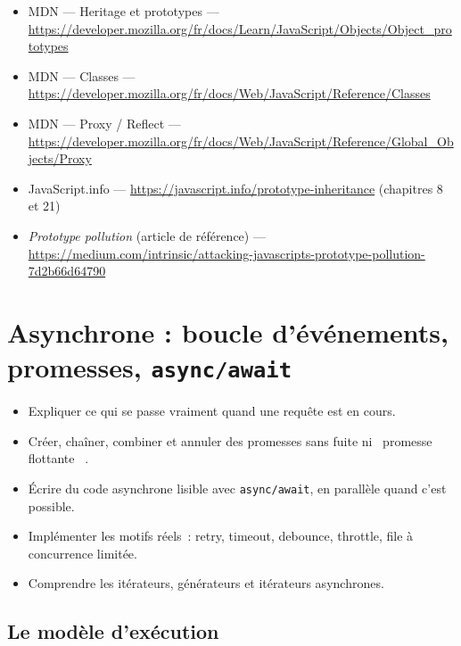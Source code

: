 \documentclass[12pt,a4paper,twoside,openright]{book}
\begin{document}
\begin{ressources}
\begin{itemize}
  \item MDN --- Heritage et prototypes --- \url{https://developer.mozilla.org/fr/docs/Learn/JavaScript/Objects/Object_prototypes}
  \item MDN --- Classes --- \url{https://developer.mozilla.org/fr/docs/Web/JavaScript/Reference/Classes}
  \item MDN --- Proxy / Reflect --- \url{https://developer.mozilla.org/fr/docs/Web/JavaScript/Reference/Global_Objects/Proxy}
  \item JavaScript.info --- \url{https://javascript.info/prototype-inheritance} (chapitres 8 et 21)
  \item \emph{Prototype pollution} (article de r\'ef\'erence) --- \url{https://medium.com/intrinsic/attacking-javascripts-prototype-pollution-7d2b66d64790}
\end{itemize}
\end{ressources}

\chapter{Asynchrone : boucle d'\'ev\'enements, promesses, \texttt{async/await}}
\label{ch-js-async}

\begin{objectif}
\begin{itemize}
  \item Expliquer ce qui se passe vraiment quand une requ\^ete est en cours.
  \item Cr\'eer, cha\^iner, combiner et annuler des promesses sans fuite ni \og ~promesse flottante~ \fg{}.
  \item \'Ecrire du code asynchrone lisible avec \verb|async/await|, en parall\`ele quand c'est possible.
  \item Impl\'ementer les motifs r\'eels~: retry, timeout, debounce, throttle, file \`a concurrence limit\'ee.
  \item Comprendre les it\'erateurs, g\'en\'erateurs et it\'erateurs asynchrones.
\end{itemize}
\end{objectif}

\section{Le mod\`ele d'ex\'ecution}
\end{document}
